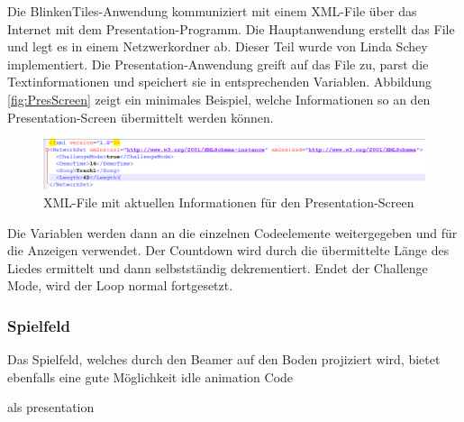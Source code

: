 Die BlinkenTiles-Anwendung kommuniziert mit einem XML-File über das Internet mit dem Presentation-Programm. Die Hauptanwendung erstellt das File und legt es in einem Netzwerkordner ab. Dieser Teil wurde von Linda Schey implementiert. Die Presentation-Anwendung greift auf das File zu, parst die Textinformationen und speichert sie in entsprechenden Variablen. Abbildung \autoref{fig:PresScreen} zeigt ein minimales Beispiel, welche Informationen so an den Presentation-Screen übermittelt werden können.

\begin{figure}[htbp]
	\centering
		\includegraphics[width=1.0\textwidth]{images/XML.png}
	\caption{XML-File mit aktuellen Informationen für den Presentation-Screen }
	\label{fig:PresScreen}
\end{figure}

Die Variablen werden dann an die einzelnen Codeelemente weitergegeben und für die Anzeigen verwendet. Der Countdown wird durch die übermittelte Länge des Liedes ermittelt und dann selbstständig dekrementiert. Endet der Challenge Mode, wird der Loop normal fortgesetzt.

\subsubsection{Spielfeld}
Das Spielfeld, welches durch den Beamer auf den Boden projiziert wird, bietet ebenfalls eine gute Möglichkeit
idle animation
Code

als presentation
